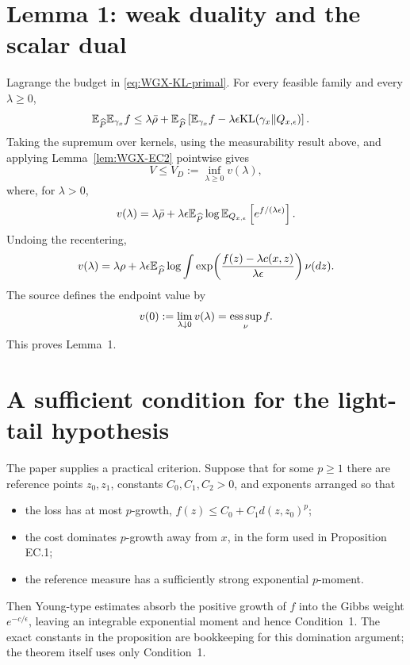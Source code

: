 \section{Lemma 1: weak duality and the scalar dual}
Lagrange the budget in \eqref{eq:WGX-KL-primal}.  For every feasible family and every $\lambda\ge0$,
\begin{align*}
 \mathbb{E}_{\widehat P}\mathbb{E}_{\gamma_x}f
 &\le\lambda\bar\rho
 +\mathbb{E}_{\widehat P}
 \left[
 \mathbb{E}_{\gamma_x}f
 -\lambda\epsilon\mathrm{KL}(\gamma_x\|Q_{x,\epsilon})
 \right].
\end{align*}
Taking the supremum over kernels, using the measurability result above, and applying Lemma~\ref{lem:WGX-EC2} pointwise gives
\begin{equation}\label{eq:WGX-dual}
 V\le V_D:=\inf_{\lambda\ge0}v(\lambda),
\end{equation}
where, for $\lambda>0$,
\begin{equation}\label{eq:WGX-v}
 v(\lambda)
 =\lambda\bar\rho
 +\lambda\epsilon\mathbb{E}_{\widehat P}
 \log\mathbb{E}_{Q_{x,\epsilon}}
 \left[e^{f/(\lambda\epsilon)}\right].
\end{equation}
Undoing the recentering,
\begin{equation}\label{eq:WGX-v-original}
 v(\lambda)
 =\lambda\rho
 +\lambda\epsilon\mathbb{E}_{\widehat P}
 \log\int
 \exp\!\left(\frac{f(z)-\lambda c(x,z)}{\lambda\epsilon}\right)\nu(dz).
\end{equation}
The source defines the endpoint value by
\begin{equation}\label{eq:WGX-v0}
 v(0):=\lim_{\lambda\downarrow0}v(\lambda)=\operatorname*{ess\,sup}_\nu f.
\end{equation}
This proves Lemma~1.

\section{A sufficient condition for the light-tail hypothesis}
The paper supplies a practical criterion.  Suppose that for some $p\ge1$ there are reference points $z_0,z_1$, constants $C_0,C_1,C_2>0$, and exponents arranged so that
\begin{itemize}[leftmargin=2em]
\item the loss has at most $p$-growth, $f(z)\le C_0+C_1d(z,z_0)^p$;
\item the cost dominates $p$-growth away from $x$, in the form used in Proposition EC.1;
\item the reference measure has a sufficiently strong exponential $p$-moment.
\end{itemize}
Then Young-type estimates absorb the positive growth of $f$ into the Gibbs weight $e^{-c/\epsilon}$, leaving an integrable exponential moment and hence Condition~1.  The exact constants in the proposition are bookkeeping for this domination argument; the theorem itself uses only Condition~1.

